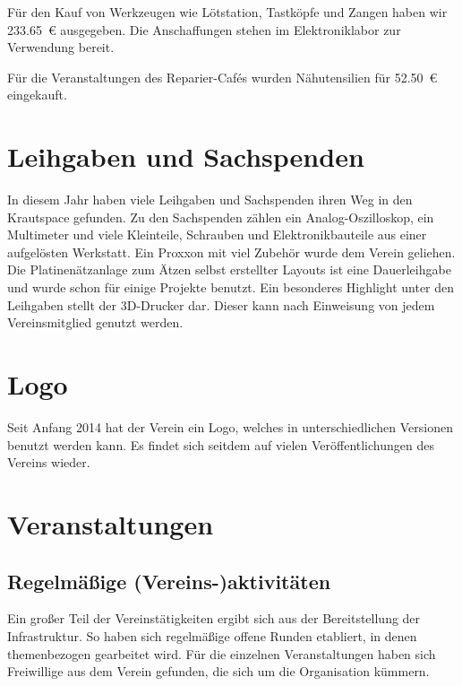 \documentclass[ngerman]{scrartcl}
\begin{document}
Für den Kauf von Werkzeugen wie Lötstation, Tastköpfe und Zangen haben wir \num{233,65}~\euro{} ausgegeben.
Die Anschaffungen stehen im Elektroniklabor zur Verwendung bereit.

Für die Veranstaltungen des Reparier-Cafés wurden Nähutensilien für \num{52,50}~\euro{} eingekauft.

\section{Leihgaben und Sachspenden}

In diesem Jahr haben viele Leihgaben und Sachspenden ihren Weg in den Krautspace gefunden. 
Zu den Sachspenden zählen ein Analog-Oszilloskop, ein Multimeter und viele Kleinteile, Schrauben und Elektronikbauteile aus einer aufgelösten Werkstatt.
Ein Proxxon mit viel Zubehör wurde dem Verein geliehen.
Die Platinenätzanlage zum Ätzen selbst erstellter Layouts ist eine Dauerleihgabe und wurde schon für einige Projekte benutzt.
Ein besonderes Highlight unter den Leihgaben stellt der 3D-Drucker dar.
Dieser kann nach Einweisung von jedem Vereinsmitglied genutzt werden.

\section{Logo}

Seit Anfang 2014 hat der Verein ein Logo, welches in unterschiedlichen Versionen benutzt werden kann. 
Es findet sich seitdem auf vielen Veröffentlichungen des Vereins wieder. 

\section{Veranstaltungen}

\subsection{Regelmäßige (Vereins-)aktivitäten}

Ein großer Teil der Vereinstätigkeiten ergibt sich aus der
Bereitstellung der Infrastruktur. So haben sich regelmäßige offene Runden
etabliert, in denen themenbezogen gearbeitet wird. Für die
einzelnen Veranstaltungen haben sich Freiwillige aus dem Verein
gefunden, die sich um die Organisation kümmern.
\end{document}
